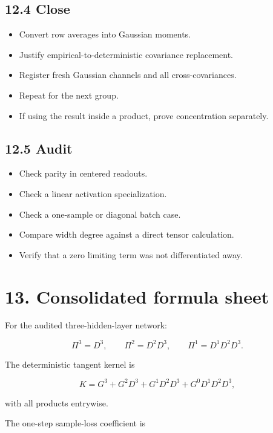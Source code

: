\subsection*{12.4 Close}


\begin{itemize}
\item Convert row averages into Gaussian moments.
\item Justify empirical-to-deterministic covariance replacement.
\item Register fresh Gaussian channels and all cross-covariances.
\item Repeat for the next group.
\item If using the result inside a product, prove concentration separately.
\end{itemize}


\subsection*{12.5 Audit}


\begin{itemize}
\item Check parity in centered readouts.
\item Check a linear activation specialization.
\item Check a one-sample or diagonal batch case.
\item Compare width degree against a direct tensor calculation.
\item Verify that a zero limiting term was not differentiated away.
\end{itemize}


\section*{13. Consolidated formula sheet}


For the audited three-hidden-layer network:

\[
\Pi^3=D^3,\qquad
\Pi^2=D^2D^3,\qquad
\Pi^1=D^1D^2D^3.
\]


The deterministic tangent kernel is

\[
K
=
G^3+G^2D^3+G^1D^2D^3+G^0D^1D^2D^3,
\]


with all products entrywise.

The one-step sample-loss coefficient is

